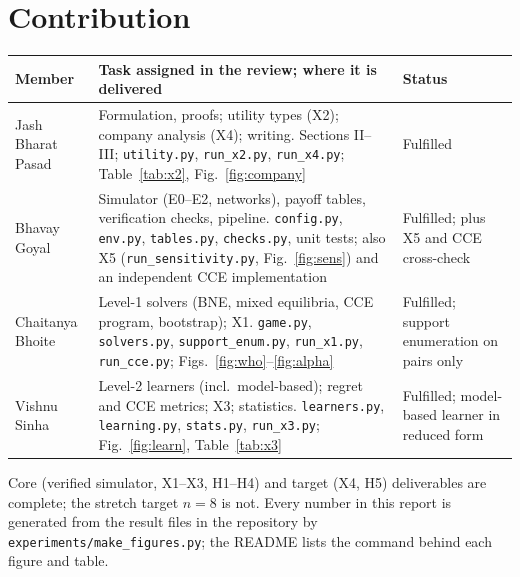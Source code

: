 \documentclass[conference]{IEEEtran}
\theoremstyle{plain}
\theoremstyle{definition}\newtheorem{definition}{Definition}
\begin{document}
\section{Contribution}
{\centering\footnotesize
\setlength{\tabcolsep}{3pt}\begin{tabular}{@{}>{\raggedright\arraybackslash}p{1.3cm}>{\raggedright\arraybackslash}p{5.35cm}>{\raggedright\arraybackslash}p{1.75cm}@{}}
\toprule
Member & Task assigned in the review; where it is delivered & Status\\\midrule
Jash Bharat Pasad & Formulation, proofs; utility types (X2); company analysis (X4); writing. Sections II--III; \texttt{utility.py}, \texttt{run\_x2.py}, \texttt{run\_x4.py}; Table~\ref{tab:x2}, Fig.~\ref{fig:company} & Fulfilled\\
Bhavay Goyal & Simulator (E0--E2, networks), payoff tables, verification checks, pipeline. \texttt{config.py}, \texttt{env.py}, \texttt{tables.py}, \texttt{checks.py}, unit tests; also X5 (\texttt{run\_sensitivity.py}, Fig.~\ref{fig:sens}) and an independent CCE implementation & Fulfilled; plus X5 and CCE cross-check\\
Chaitanya Bhoite & Level-1 solvers (BNE, mixed equilibria, CCE program, bootstrap); X1. \texttt{game.py}, \texttt{solvers.py}, \texttt{support\_enum.py}, \texttt{run\_x1.py}, \texttt{run\_cce.py}; Figs.~\ref{fig:who}--\ref{fig:alpha} & Fulfilled; support enumeration on pairs only\\
Vishnu Sinha & Level-2 learners (incl.\ model-based); regret and CCE metrics; X3; statistics. \texttt{learners.py}, \texttt{learning.py}, \texttt{stats.py}, \texttt{run\_x3.py}; Fig.~\ref{fig:learn}, Table~\ref{tab:x3} & Fulfilled; model-based learner in reduced form\\
\bottomrule
\end{tabular}\par}
\smallskip
Core (verified simulator, X1--X3, H1--H4) and target (X4, H5) deliverables are complete; the stretch target $n=8$ is not.
Every number in this report is generated from the result files in the repository by \texttt{experiments/make\_figures.py}; the README lists the command behind each figure and table.
\end{document}
